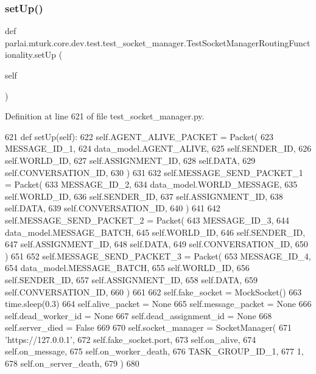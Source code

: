 \subsubsection{\texorpdfstring{set\+Up()}{setUp()}}
{\footnotesize\ttfamily def parlai.\+mturk.\+core.\+dev.\+test.\+test\+\_\+socket\+\_\+manager.\+Test\+Socket\+Manager\+Routing\+Functionality.\+set\+Up (\begin{DoxyParamCaption}\item[{}]{self }\end{DoxyParamCaption})}



Definition at line 621 of file test\+\_\+socket\+\_\+manager.\+py.


\begin{DoxyCode}
621     \textcolor{keyword}{def }setUp(self):
622         self.AGENT\_ALIVE\_PACKET = Packet(
623             MESSAGE\_ID\_1,
624             data\_model.AGENT\_ALIVE,
625             self.SENDER\_ID,
626             self.WORLD\_ID,
627             self.ASSIGNMENT\_ID,
628             self.DATA,
629             self.CONVERSATION\_ID,
630         )
631 
632         self.MESSAGE\_SEND\_PACKET\_1 = Packet(
633             MESSAGE\_ID\_2,
634             data\_model.WORLD\_MESSAGE,
635             self.WORLD\_ID,
636             self.SENDER\_ID,
637             self.ASSIGNMENT\_ID,
638             self.DATA,
639             self.CONVERSATION\_ID,
640         )
641 
642         self.MESSAGE\_SEND\_PACKET\_2 = Packet(
643             MESSAGE\_ID\_3,
644             data\_model.MESSAGE\_BATCH,
645             self.WORLD\_ID,
646             self.SENDER\_ID,
647             self.ASSIGNMENT\_ID,
648             self.DATA,
649             self.CONVERSATION\_ID,
650         )
651 
652         self.MESSAGE\_SEND\_PACKET\_3 = Packet(
653             MESSAGE\_ID\_4,
654             data\_model.MESSAGE\_BATCH,
655             self.WORLD\_ID,
656             self.SENDER\_ID,
657             self.ASSIGNMENT\_ID,
658             self.DATA,
659             self.CONVERSATION\_ID,
660         )
661 
662         self.fake\_socket = MockSocket()
663         time.sleep(0.3)
664         self.alive\_packet = \textcolor{keywordtype}{None}
665         self.message\_packet = \textcolor{keywordtype}{None}
666         self.dead\_worker\_id = \textcolor{keywordtype}{None}
667         self.dead\_assignment\_id = \textcolor{keywordtype}{None}
668         self.server\_died = \textcolor{keyword}{False}
669 
670         self.socket\_manager = SocketManager(
671             \textcolor{stringliteral}{'https://127.0.0.1'},
672             self.fake\_socket.port,
673             self.on\_alive,
674             self.on\_message,
675             self.on\_worker\_death,
676             TASK\_GROUP\_ID\_1,
677             1,
678             self.on\_server\_death,
679         )
680 
\end{DoxyCode}

